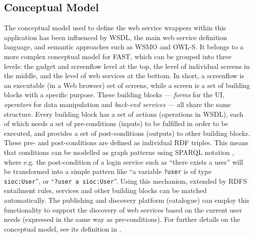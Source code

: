 
\subsection{Conceptual Model}
\label{ssec:ontology}
The conceptual model used to define the web service wrappers within this application has been influenced by WSDL, the main web service definition language, and semantic approaches such as WSMO and OWL-S. It belongs to a more complex conceptual model for FAST, which can be grouped into three levels: the gadget and screenflow level at the top, the level of individual screens in the middle, and the level of web services at the bottom. 
In short, a screenflow is an executable (in a Web browser) set of screens, while a screen is a set of building blocks with a specific purpose. These building blocks --- \emph{forms} for the UI, \emph{operators} for data manipulation and \emph{back-end services} --- all share the same structure. Every building block has a set of actions (operations in WSDL), each of which needs a set of pre-conditions (inputs) to be fulfilled in order to be executed, and provides a set of post-conditions (outputs) to other building blocks. These pre- and post-conditions are defined as individual RDF triples. This means that conditions can be modelled as graph patterns using SPARQL notation \cite{sparql2008spec}, where e.g. the post-condition of a login service such as ``there exists a user'' will be transformed into a simple pattern like ``a variable \texttt{?user} is of type \texttt{sioc:User}'', or ``\texttt{?user a sioc:User}''. Using this mechanism, extended by RDFS entailment rules, services and other building blocks can be matched automatically. The publishing and discovery platform (catalogue) can employ this functionality to support the discovery of web services based on the current user needs (expressed in the same way as pre-conditions). For further details on the conceptual model, see its definition in \cite{moeller2010fast_ontology}.

